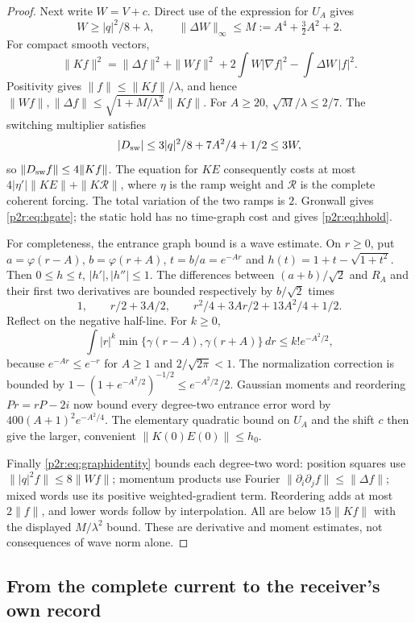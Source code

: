 \documentclass[11pt]{article}
\numberwithin{equation}{section}
\theoremstyle{definition}
\theoremstyle{remark}
\begin{document}
\begin{proof}
Next write $W=V+c$. Direct use of the expression for $U_A$ gives
\[
 W\geq |q|^2/8+\lambda,\qquad
 \|\Delta W\|_\infty\leq M:=A^4+\tfrac32A^2+2.
\]
For compact smooth vectors,
\begin{equation}\label{p2r:eq:graphidentity}
 \|Kf\|^2=\|\Delta f\|^2+\|Wf\|^2+
              2\int W|\nabla f|^2-\int\Delta W\,|f|^2.
\end{equation}
Positivity gives $\|f\|\leq\|Kf\|/\lambda$, and hence
$\|Wf\|,\|\Delta f\|\leq\sqrt{1+M/\lambda^2}\|Kf\|$.
For $A\geq20$, $\sqrt M/\lambda\leq2/7$.
The switching multiplier satisfies
\[
 |D_{\rm sw}|\leq3|q|^2/8+7A^2/4+1/2\leq3W,
\]
so $\|D_{\rm sw}f\|\leq4\|Kf\|$.
The equation for $KE$ consequently costs at most
$4|\eta'|\|KE\|+\|K\mathcal R\|$, where $\eta$ is the ramp
weight and $\mathcal R$ is the complete coherent forcing.
The total variation of the two ramps is $2$.
Gronwall gives \eqref{p2r:eq:hgate}; the static hold has no
time-graph cost and gives \eqref{p2r:eq:hhold}.

For completeness, the entrance graph bound is a wave estimate.
On $r\geq0$, put $a=\varphi(r-A)$, $b=\varphi(r+A)$,
$t=b/a=e^{-Ar}$ and $h(t)=1+t-\sqrt{1+t^2}$.
Then $0\leq h\leq t$, $|h'|,|h''|\leq1$. The differences between
$(a+b)/\sqrt2$ and $R_A$ and their first two derivatives are bounded
respectively by $b/\sqrt2$ times
\[
 1,\qquad r/2+3A/2,\qquad
 r^2/4+3Ar/2+13A^2/4+1/2 .
\]
Reflect on the negative half-line. For $k\geq0$,
\[
 \int |r|^k\min\{\gamma(r-A),\gamma(r+A)\}\,dr
 \leq k!e^{-A^2/2},
\]
because $e^{-Ar}\leq e^{-r}$ for $A\geq1$ and
$2/\sqrt{2\pi}<1$. The normalization correction is bounded by
$1-(1+e^{-A^2/2})^{-1/2}\leq e^{-A^2/2}/2$.
Gaussian moments and reordering $P r=rP-2i$ now bound every
degree-two entrance error word by
$400(A+1)^2e^{-A^2/4}$.
The elementary quadratic bound on $U_A$ and the shift $c$ then
give the larger, convenient $\|K(0)E(0)\|\leq h_0$.

Finally \eqref{p2r:eq:graphidentity} bounds each degree-two word:
position squares use $\||q|^2f\|\leq8\|Wf\|$;
momentum products use Fourier
$\|\partial_i\partial_jf\|\leq\|\Delta f\|$;
mixed words use its positive weighted-gradient term.
Reordering adds at most $2\|f\|$, and lower words follow by
interpolation. All are below $15\|Kf\|$ with the displayed
$M/\lambda^2$ bound. These are derivative and moment estimates,
not consequences of wave norm alone.
\end{proof}

\subsection{From the complete current to the receiver's own record}
\end{document}
